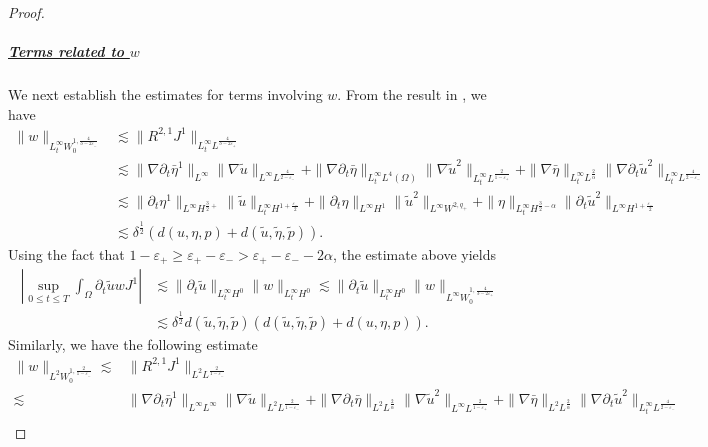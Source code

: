 \documentclass[letterpaper,reqno,10pt,twoside]{amsart}
\theoremstyle{definition}
\theoremstyle{remark}
\def\p{\partial}
\begin{document}
\begin{proof}
			\subparagraph{\underline{Terms related to $w$}}
			We next establish the estimates for terms involving $w$. From the result in \cite[Section 10]{GT2020}, we have
			\[
			\begin{aligned}
				\|w\|_{L_{t}^{\infty}W_{0}^{1,\frac{4}{3-2\varepsilon_{-}}}}&\lesssim \|R^{2,1}J^{1}\|_{L_{t}^{\infty}L^{\frac{4}{3-2\varepsilon_{+}}}}\\
				&\lesssim \|\nabla \p_{t}\bar{\eta}^{1}\|_{L^{\infty}}\|\nabla\tilde{u}\|_{L^{\infty}L^{\frac{4}{2-\varepsilon_{-}}}}+\|\nabla \p_{t}\bar{\eta}\|_{L_{t}^{\infty}L^{4}(\Omega)}\|\nabla\tilde{u}^{2}\|_{L_{t}^{\infty}L^{\frac{2}{1-\varepsilon_{+}}}}+\|\nabla \bar{\eta}\|_{L_{t}^{\infty}L^{\frac{2}{\alpha}}}\|\nabla \p_{t}\tilde{u}^{2}\|_{L_{t}^{\infty}L^{\frac{4}{2-\varepsilon_{-}}}}\\
				&\lesssim \|\p_{t}\eta^{1}\|_{L^{\infty}H^{\frac{3}{2}+}}\|\tilde{u}\|_{L_{t}^{\infty}H^{1+\frac{\varepsilon_{-}}{2}}}+\|\p_{t}\eta\|_{L^{\infty}H^{1}}\|\tilde{u}^{2}\|_{L^{\infty}W^{2,q_{+}}}+\|\eta\|_{L_{t}^{\infty}H^{\frac{3}{2}-\alpha}}\|\p_{t}\tilde{u}^{2}\|_{L^{\infty}H^{1+\frac{\varepsilon_{-}}{2}}}\\
				&\lesssim \delta^{\frac{1}{2}}(d(u,\eta,p)+d(\tilde{u},\tilde{\eta},\tilde{p})).
			\end{aligned}
			\]
			Using the fact that $1-\varepsilon_{+}\geq \varepsilon_{+}-\varepsilon_{-}>\varepsilon_{+}-\varepsilon_{-}-2\alpha$, the estimate above yields
			\[
			\begin{aligned}
				|\sup_{0\leq t\leq T}\int_{\Omega}\p_{t}\tilde{u}wJ^{1}|&\lesssim \|\p_{t}\tilde{u}\|_{L_{t}^{\infty}H^{0}}\|w\|_{L_{t}^{\infty}H^{0}}\lesssim \|\p_{t}\tilde{u}\|_{L_{t}^{\infty}H^{0}}\|w\|_{L^{\infty}W_{0}^{1,\frac{4}{3-2\varepsilon_{+}}}}\\
				&\lesssim \delta^{\frac{1}{2}}d(\tilde{u},\tilde{\eta},\tilde{p})(d(\tilde{u},\tilde{\eta},\tilde{p})+d({u},{\eta},{p})).
			\end{aligned}
			\]
			\noindent Similarly, we have the following estimate
			\[
			\begin{aligned}
				\|w\|_{L^{2}W_{0}^{1,\frac{2}{1-\varepsilon_{-}}}}\lesssim&\|R^{2,1}J^{1}\|_{L^{2}L^{\frac{2}{1-\varepsilon_{-}}}}\\
				\lesssim&\|\nabla \p_{t}\bar{\eta}^{1}\|_{L^{\infty}L^{\infty}}\|\nabla \tilde{u}\|_{L^{2}L^{\frac{2}{1-\varepsilon_{-}}}}+\|\nabla \p_{t}\bar{\eta}\|_{L^{2}L^{\frac{2}{\alpha}}}\|\nabla \tilde{u}^{2}\|_{L^{\infty}L^{\frac{2}{1-\varepsilon_{+}}}}+\|\nabla \bar{\eta}\|_{L^{2}L^{\frac{2}{\alpha}}}\|\nabla \p_{t}\tilde{u}^{2}\|_{L_{t}^{\infty}L^{\frac{4}{2-\varepsilon_{-}}}}\\

\end{aligned}\]
\end{proof}
\end{document}
